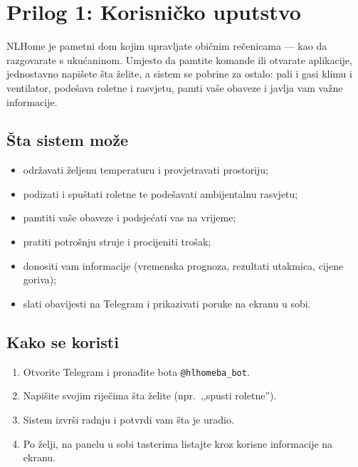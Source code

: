\documentclass[11pt,a4paper]{article}
\begin{document}
\appendix
\section{Prilog 1: Korisničko uputstvo}

NLHome je pametni dom kojim upravljate običnim rečenicama --- kao da razgovarate s
ukućaninom. Umjesto da pamtite komande ili otvarate aplikacije, jednostavno napišete šta
želite, a sistem se pobrine za ostalo: pali i gasi klimu i ventilator, podešava roletne i
rasvjetu, pamti vaše obaveze i javlja vam važne informacije.

\subsection{Šta sistem može}
\begin{itemize}[nosep]
      \item održavati željenu temperaturu i provjetravati prostoriju;
      \item podizati i spuštati roletne te podešavati ambijentalnu rasvjetu;
      \item pamtiti vaše obaveze i podsjećati vas na vrijeme;
      \item pratiti potrošnju struje i procijeniti trošak;
      \item donositi vam informacije (vremenska prognoza, rezultati utakmica, cijene goriva);
      \item slati obavijesti na Telegram i prikazivati poruke na ekranu u sobi.
\end{itemize}

\subsection{Kako se koristi}
\begin{enumerate}[nosep]
      \item Otvorite Telegram i pronađite bota \texttt{@hlhomeba\_bot}.
      \item Napišite svojim riječima šta želite (npr.\ ,,spusti roletne'').
      \item Sistem izvrši radnju i potvrdi vam šta je uradio.
      \item Po želji, na panelu u sobi tasterima listajte kroz korisne informacije na ekranu.
\end{enumerate}
\end{document}
